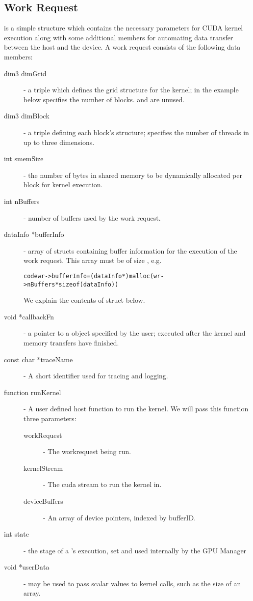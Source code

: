 \subsection{Work Request}
 is a simple structure which contains the necessary parameters
for CUDA kernel execution along with some additional members for automating
data transfer between the host and the device.
A work request consists of the following data members:

\begin{description}
\item[dim3 dimGrid]- a triple which defines the grid structure for the kernel;
in the example below  specifies the number of blocks.
 and  are unused.

\item[dim3 dimBlock]- a triple defining each block's structure;
specifies the number of threads in up to three dimensions.

\item[int smemSize]- the number of bytes in shared memory to be dynamically
allocated per block for kernel execution.

\item[int nBuffers]- number of buffers used by the work request.

\item[dataInfo *bufferInfo]- array of  structs containing buffer
information for the execution of the work request. This array must be of size , e.g.
\begin{alltt}
code{wr->bufferInfo = (dataInfo *) malloc(wr->nBuffers * sizeof(dataInfo))}
\end{alltt}
We explain the contents of  struct below.

\item[void *callbackFn]- a pointer to a  object specified by the user;
executed after the kernel and memory transfers have finished.

\item[const char *traceName]- A short identifier used for tracing and logging.

\item[function runKernel]- A user defined host function to run the kernel.
   We will pass this function three parameters:
   \begin{description}
   \item[workRequest]- The workrequest being run.
   \item[kernelStream]- The cuda stream to run the kernel in.
   \item[deviceBuffers]- An array of device pointers, indexed by bufferID.
   \end{description}

\item[int state]- the stage of a 's execution, set and used internally by the GPU Manager

\item[void *userData]-  may be used to pass scalar values to kernel
calls, such as the size of an array.

\end{description}

